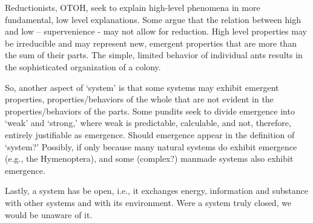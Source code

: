 Reductionists, OTOH, seek to explain high-level phenomena in more fundamental, low level explanations. Some argue that the relation between high and low – supervenience - may not allow for reduction. High level properties may be irreducible and may represent new, emergent properties that are more than the sum of their parts. The simple, limited behavior of individual ants results in the sophisticated organization of a colony.

So, another aspect of `system’ is that some systems may exhibit emergent properties, properties/behaviors of the whole that are not evident in the properties/behaviors of the parts. Some pundits seek to divide emergence into `weak’ and `strong,’ where weak is predictable, calculable, and not, therefore, entirely justifiable as emergence. Should emergence appear in the definition of `system?’  Possibly, if only because many natural systems do exhibit emergence (e.g., the Hymenoptera), and some (complex?) manmade systems also exhibit emergence.

Lastly, a system has be open, i.e., it exchanges energy, information and substance with other systems and with its environment. Were a system truly closed, we would be unaware of it.